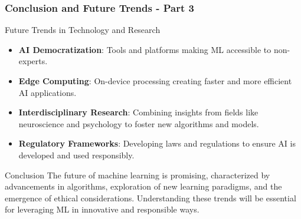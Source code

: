 \documentclass{beamer}
\begin{document}
\begin{frame}[fragile]
    \frametitle{Conclusion and Future Trends - Part 3}
    \begin{block}{Future Trends in Technology and Research}
        \begin{itemize}
            \item \textbf{AI Democratization}: Tools and platforms making ML accessible to non-experts.
            \item \textbf{Edge Computing}: On-device processing creating faster and more efficient AI applications.
            \item \textbf{Interdisciplinary Research}: Combining insights from fields like neuroscience and psychology to foster new algorithms and models.
            \item \textbf{Regulatory Frameworks}: Developing laws and regulations to ensure AI is developed and used responsibly.
        \end{itemize}
    \end{block}

    \begin{block}{Conclusion}
        The future of machine learning is promising, characterized by advancements in algorithms, exploration of new learning paradigms, and the emergence of ethical considerations. Understanding these trends will be essential for leveraging ML in innovative and responsible ways.
    \end{block}
\end{frame}
\end{document}
